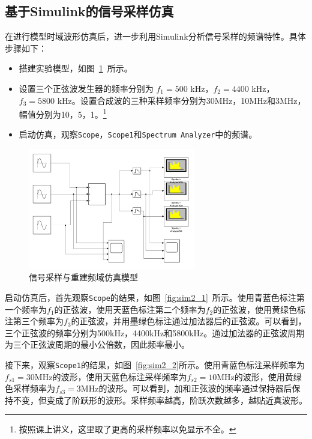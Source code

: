 \documentclass[lang=cn,newtx,10pt,scheme=chinese]{elegantbook}
\begin{document}
\subsection{基于Simulink的信号采样仿真}

在进行模型时域波形仿真后，进一步利用Simulink分析信号采样的频谱特性。具体步骤如下：
\begin{itemize}
  \item 搭建实验模型，如图~\ref{fig:model2}~所示。
  \item 设置三个正弦波发生器的频率分别为 $f_1 = 500$ kHz，$f_2 = 4400$ kHz，$f_3 = 5800$ kHz。设置合成波的三种采样频率分别为30MHz，10MHz和3MHz，幅值分别为10，5，1。\footnote{按照课上讲义，这里取了更高的采样频率以免显示不全。}
  \item 启动仿真，观察\lstinline{Scope}，\lstinline{Scope1}和\lstinline{Spectrum Analyzer}中的频谱。

\end{itemize}

\begin{figure}[htbp]
  \centering
  \includegraphics[width=0.65\textwidth]{figure/model2.png}
  \caption{信号采样与重建频域仿真模型}
  \label{fig:model2}
\end{figure}

启动仿真后，首先观察\lstinline{Scope}的结果，如图~\ref{fig:sim2_1}~所示。使用青蓝色标注第一个频率为$f_1$的正弦波，使用天蓝色标注第二个频率为$f_2$的正弦波，使用黄绿色标注第三个频率为$f_3$的正弦波，并用墨绿色标注通过加法器后的正弦波。可以看到，三个正弦波的频率分别为500kHz，4400kHz和5800kHz。通过加法器的正弦波周期为三个正弦波周期的最小公倍数，因此频率最小。

接下来，观察\lstinline{Scope1}的结果，如图~\ref{fig:sim2_2}所示。使用青蓝色标注采样频率为$f_{s1} = 30$MHz的波形，使用天蓝色标注采样频率为$f_{s2} = 10$MHz的波形，使用黄绿色采样频率为$f_{s3} = 3$MHz的波形。可以看到，加和正弦波的频率通过保持器后保持不变，但变成了阶跃形的波形。采样频率越高，阶跃次数越多，越贴近真波形。
\end{document}

